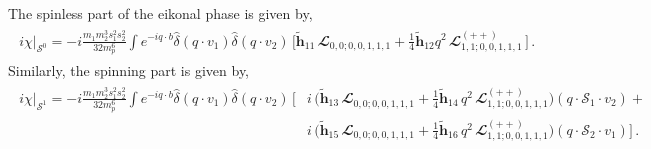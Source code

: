The spinless part of the eikonal phase is given by,
\begin{align}
    \begin{split}\label{eq5}
        i\chi\Big|_{\mathcal{S}^0}=-i\frac{m_1m_2^3 s_1^2 s_2^2}{32 m_p^6}\int e^{-iq\cdot b}\hat\delta(q\cdot v_1)\hat\delta(q\cdot v_2)\,\Bigg[\boldsymbol{\tilde h}_{11}\,\mathbfcal{L}_{0,0;0,0,1,1,1}+\frac{1}{4}\boldsymbol{\tilde h}_{12}q^2\,\mathbfcal{L}^{(++)}_{1,1;0,0,1,1,1}\,\Bigg]\,.
    \end{split}
\end{align}
Similarly, the spinning part is given by, 
\begin{align}
    \begin{split} \label{eq6}
      i\chi\Big|_{\mathcal{S}^1}=-i\frac{m_1m_2^3 s_1^2 s_2^2}{32 m_p^6}\int e^{-iq\cdot b}\hat\delta(q\cdot v_1)\hat\delta(q\cdot v_2)\,\Bigg[ &i\,\Bigg(\boldsymbol{\tilde h}_{13} \,\mathbfcal{L}_{0,0;0,0,1,1,1}+ \frac{1}{4}\boldsymbol{\tilde h}_{14} \,q^2\,\mathbfcal{L}^{(++)}_{1,1;0,0,1,1,1}\Bigg)(q\cdot \mathcal{S}_1\cdot v_2)+\\ &i\,\Bigg(\boldsymbol{\tilde h}_{15}\,\mathbfcal{L}_{0,0;0,0,1,1,1}+ \frac{1}{4}\boldsymbol{\tilde h}_{16}\,q^2\,\mathbfcal{L}^{(++)}_{1,1;0,0,1,1,1}\Bigg)(q\cdot \mathcal{S}_2\cdot v_1)\Bigg]\,.
    \end{split}
\end{align}

